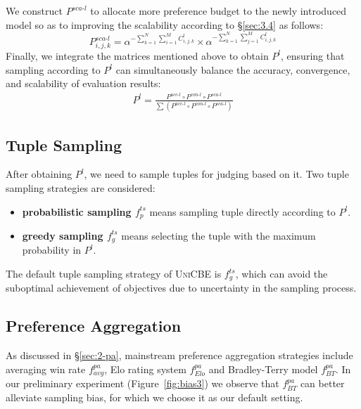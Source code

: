 We construct $P^{sca\text{-}l}$ to allocate more preference budget to the newly introduced model so as to improving the scalability according to \S\ref{sec:3.4} as follows:
\begin{equation}
    P^{sca\text{-}l}_{i,j,k} = \alpha^{-\sum_{k=1}^{N}\sum_{i=1}^{M} C^l_{i,j,k}}\times \alpha^{-\sum_{k=1}^{N}\sum_{j=1}^{M} C^l_{i,j,k}}
    \label{eq:13}
\end{equation}
Finally, we integrate the matrices mentioned above to obtain $P^l$, ensuring that sampling according to $P^l$ can simultaneously balance the accuracy, convergence, and scalability of evaluation results:
\begin{equation}
\begin{aligned}
    P^{l} = \frac{P^{acc\text{-}l} \circ P^{con\text{-}l} \circ P^{sca\text{-}l}}{\sum (P^{acc\text{-}l} \circ P^{con\text{-}l} \circ P^{sca\text{-}l})}
    \label{eq:14}
\end{aligned}
\end{equation}


\subsection{Tuple Sampling}
After obtaining \( P^l \), we need to sample tuples for judging based on it. Two tuple sampling strategies are considered: 
\begin{itemize}[leftmargin=20pt]
\setlength{\itemsep}{0pt}
\setlength{\parsep}{0pt}
\setlength{\parskip}{0pt}
\item \textbf{probabilistic sampling $f^{ts}_{p}$} means sampling tuple directly according to \( P^l \).
\item \textbf{greedy sampling $f^{ts}_{g}$} means selecting the tuple with the maximum probability in \( P^l \).
\end{itemize}
The default tuple sampling strategy of \textsc{UniCBE} is $f^{ts}_{g}$, which can avoid the suboptimal achievement of objectives due to uncertainty in the sampling process.

\subsection{Preference Aggregation}
As discussed in \S\ref{sec:2-pa}, mainstream preference aggregation strategies include averaging win rate $f^{pa}_{avg}$, Elo rating system $f^{pa}_{Elo}$ and Bradley-Terry model $f^{pa}_{BT}$. In our preliminary experiment (Figure~\ref{fig:bias3}) we observe that $f^{pa}_{BT}$ can better alleviate sampling bias, for which we choose it as our default setting.
